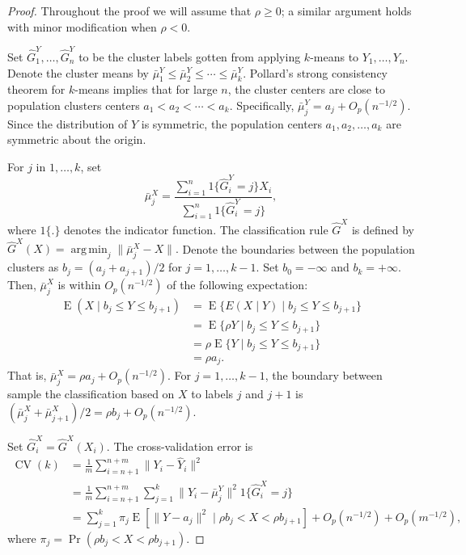 \documentclass[12pt]{article}
\DeclareMathOperator*{\argmin}{arg\,min}
\newcommand{\CV}{\operatorname{CV}}
\newcommand{\E}{\operatorname{E}}
\newcommand{\OhP}{O_p}
\newcommand{\bmuX}{\bar \mu^{X}}
\newcommand{\bmuY}{\bar \mu^{Y}}
\newcommand{\hGX}{\hat G^{X}}
\newcommand{\hGY}{\hat G^{Y}}
\begin{document}
\begin{proof}

Throughout the proof we will assume that $\rho \geq 0$; a similar argument
holds with minor modification when $\rho < 0$.


Set $\hGY_1, \dotsc, \hGY_n$ to be the cluster labels gotten from applying
$k$-means to $Y_1, \dotsc, Y_n$. Denote the cluster means by $\bmuY_1 \leq
\bmuY_2 \leq \dotsb \leq \bmuY_k$.  Pollard's \citeyearpar{pollard1981strong}
strong consistency theorem for $k$-means implies that for large $n$, the
cluster centers are close to population clusters centers $a_1 < a_2 < \dotsb <
a_k$. Specifically, $\bmuY_j = a_j + \OhP(n^{-1/2})$.  Since the distribution
of $Y$ is symmetric, the population centers $a_1, a_2, \dotsc, a_k$ are
symmetric about the origin.


For $j$ in $1, \dotsc, k$, set
\[
  \bmuX_j = \frac{\sum_{i=1}^{n} 1\{ \hGY_i = j \} X_i}
                 {\sum_{i=1}^{n} 1\{ \hGY_i = j \}},
\]
where $1\{ . \}$ denotes the indicator function.
The classification rule $\hGX$ is defined by
\(
  \hGX(X) = \argmin_j \| \bmuX_j - X \|.
\)
Denote the boundaries between the population clusters as
$b_j = (a_j + a_{j+1})/2$ for $j = 1, \dotsc, k-1$.
Set $b_0 = -\infty$ and $b_k = +\infty$. 
Then, $\bmuX_j$ is within $\OhP(n^{-1/2})$ of the following expectation:
\begin{align*}
  \E(X \mid b_j \leq Y \leq b_{j+1})
    &= \E\{ E(X \mid Y) \mid b_j \leq Y \leq b_{j+1}\} \\
    &= \E\{ \rho Y \mid b_j \leq Y \leq b_{j+1}\} \\
    &= \rho \E\{ Y \mid b_j \leq Y \leq b_{j+1}\} \\
    &= \rho a_j.
\end{align*}
That is, $\bmuX_j = \rho a_j + \OhP(n^{-1/2})$. For $j = 1, \dotsc, k-1$,
the boundary between sample the classification based on $X$ to
labels $j$ and $j+1$ is
$(\bmuX_j + \bmuX_{j+1}) /2 = \rho b_j + \OhP(n^{-1/2})$.


Set $\hGX_i = \hGX(X_i)$.
The cross-validation error is
\begin{align*}
  \CV(k)
  &= \frac{1}{m} \sum_{i=n+1}^{n+m} \|Y_i - \hat Y_i\|^2
  \\
  &= \frac{1}{m} \sum_{i=n+1}^{n+m}
  \sum_{j=1}^{k} \|Y_i - \bmuY_j\|^2 1\{ \hGX_i = j \}
  \\
  &=
  \sum_{j=1}^{k}
    \pi_j
    \E[ \|Y - a_j\|^2 \mid \rho b_j < X < \rho b_{j+1}]
  + \OhP(n^{-1/2})
  + \OhP(m^{-1/2}),
\end{align*}
where $\pi_j = \Pr(\rho b_j < X < \rho b_{j+1}).$




\end{proof}
\end{document}
